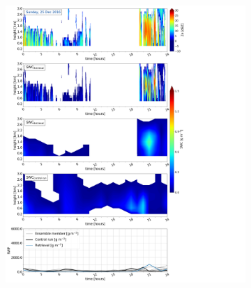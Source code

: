     \begin{figure}\ContinuedFloat
   		\centering
		\begin{subfigure}[b]{0.8\textwidth}
			\includegraphics[trim={0.5cm 0.5cm 17.5cm .5cm},clip,width=\textwidth]{./fig_SWC/20161225}
			\caption{}\label{fig:SWC25}
		\end{subfigure}
	\end{figure}
